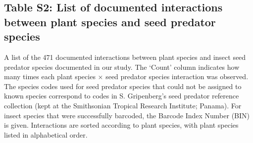 \documentclass[11pt]{article}
\begin{document}
\begin{landscape}

\section{Table S2: List of documented interactions between plant species and seed predator species} 

A list of the 471 documented interactions between plant species and insect seed predator species documented in our study. The ‘Count’ column indicates how many times each plant species $\times$ seed predator species interaction was observed. The species codes used for seed predator species that could not be assigned to known species correspond to codes in S. Gripenberg’s seed predator reference collection (kept at the Smithsonian Tropical Research Institute; Panama). For insect species that were successfully barcoded, the Barcode Index Number (BIN) is given. Interactions are sorted according to plant species, with plant species listed in alphabetical order.
\scriptsize

\begin{longtable}{@{}lllllll@{}}



\end{longtable}
\end{landscape}
\end{document}
